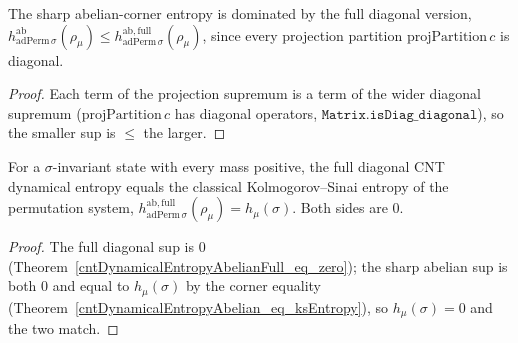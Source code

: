 \begin{lemma}\label{cntDynamicalEntropyAbelian_le_full}
  \leanok
  The sharp abelian-corner entropy is dominated by the full diagonal version,
  \(h^{\mathrm{ab}}_{\mathrm{adPerm}\,\sigma}(\rho_\mu)
    \le h^{\mathrm{ab,full}}_{\mathrm{adPerm}\,\sigma}(\rho_\mu)\), since every projection partition
  \(\mathrm{projPartition}\,c\) is diagonal.
\end{lemma}
\begin{proof}\leanok
  Each term of the projection supremum is a term of the wider diagonal supremum
  (\(\mathrm{projPartition}\,c\) has diagonal operators, \(\texttt{Matrix.isDiag\_diagonal}\)), so the
  smaller sup is \(\le\) the larger.
\end{proof}

\begin{theorem}[Full abelian corner \(=\) KS entropy]\label{cntDynamicalEntropyAbelianFull_eq_ksEntropy}
  \leanok
  For a \(\sigma\)-invariant state with every mass positive, the full diagonal CNT dynamical entropy
  equals the classical Kolmogorov--Sinai entropy of the permutation system,
  \(h^{\mathrm{ab,full}}_{\mathrm{adPerm}\,\sigma}(\rho_\mu) = h_\mu(\sigma)\). Both sides are \(0\).
\end{theorem}
\begin{proof}\leanok
  The full diagonal sup is \(0\) (Theorem~\ref{cntDynamicalEntropyAbelianFull_eq_zero}); the sharp
  abelian sup is both \(0\) and equal to \(h_\mu(\sigma)\) by the corner equality
  (Theorem~\ref{cntDynamicalEntropyAbelian_eq_ksEntropy}), so \(h_\mu(\sigma) = 0\) and the two match.
\end{proof}

